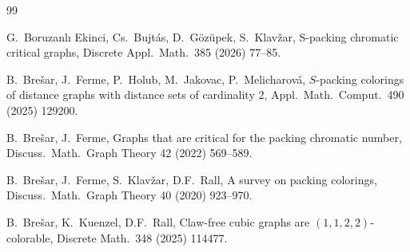 \documentclass[12pt]{article}
\begin{document}
\begin{thebibliography}{99}




G.~Boruzanl{\i} Ekinci, Cs.~Bujt\'{a}s, D.~G\"{o}z\"{u}pek, S.~Klav\v{z}ar,
S-packing chromatic critical graphs,
Discrete Appl.\ Math.\ 385 (2026) 77--85.

B.~Bre\v sar, J.~Ferme, P.~Holub, M.~Jakovac, P.~Melicharov\'a, 
{$S$}-packing colorings of distance graphs with distance sets of cardinality $2$,
Appl.\ Math.\ Comput.\ 490 (2025) 129200.

B.~Bre\v{s}ar, J.~Ferme,
Graphs that are critical for the packing chromatic number,
Discuss.\ Math.\ Graph Theory 42 (2022) 569--589.

B.~Bre\v{s}ar, J.~Ferme, S.~Klav\v{z}ar, D.F.~Rall, 
A survey on packing colorings,  
Discuss.\ Math.\ Graph Theory 40 (2020) 923--970.


B.~Bre\v{s}ar, K.~Kuenzel, D.F.~Rall, 
Claw-free cubic graphs are $(1,1,2,2)$-colorable,
Discrete Math.\ 348 (2025) 114477.





\end{thebibliography}
\end{document}
